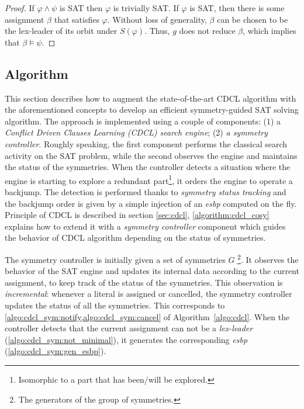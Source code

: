 \begin{proof}
	
	If $\varphi \wedge \psi$ is SAT then $\varphi$ is trivially SAT. If
	$\varphi$ is SAT, then there is some assignment $\beta$ that satisfies $\varphi$.
	Without loss of generality, $\beta$ can be chosen to be the lex-leader of its
	orbit under $S(\varphi)$. Thus, $g$ does not reduce $\beta$, which implies that
	$\beta \models \psi$.
	
\end{proof}




\subsection{Algorithm}


This section describes how to augment the state-of-the-art CDCL algorithm with
the aforementioned concepts to develop an efficient symmetry-guided SAT
solving algorithm. 
The approach is implemented using a couple of components: (1) a
\textit{Conflict Driven Clauses Learning (CDCL) search engine}; (2) \textit{a symmetry controller}. Roughly speaking, the first component performs the
classical search activity on the SAT problem, while the second observes the
engine and maintains the status of the symmetries. When the controller detects
a situation where the engine is starting to explore a redundant
part\footnote{Isomorphic to a part that has been/will be explored.}, it orders
the engine to operate a backjump. The detection is performed thanks to
\emph{symmetry status tracking} and the backjump order is given by a simple
injection of an \emph{esbp} computed on the fly.
Principle of CDCL is described in section \ref{sec:cdcl}, \cref{algorithm:cdcl_cosy} explains how to extend it with a \emph{symmetry controller} component which guides the behavior of CDCL algorithm depending on the status of symmetries.


 
 The symmetry controller is initially given a set of symmetries $G$ \footnote{The generators of the group of symmetries.}. It observes the behavior of the SAT engine and updates its internal data according to the current assignment, to keep track of the status of the symmetries. This observation is \emph{incremental}: whenever a literal is assigned or cancelled, the symmetry controller updates the status of all the symmetries. This corresponds to \cref{algo:cdcl_sym:notify,algo:cdcl_sym:cancel} of Algorithm~\ref{algo:cdcl}. When the controller detects that the
 current assignment can not be a \emph{lex-leader} (\cref{algo:cdcl_sym:not_minimal}), it generates the
 corresponding \emph{esbp} (\cref{algo:cdcl_sym:gen_esbp}).
 
